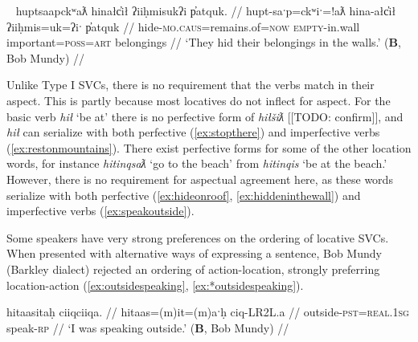 \ex~ \label{ex:hiddeninthewall}
\begingl
\glpreamble huptsaapckʷaƛ hinałc̓ił ʔiiḥmisukʔi p̓atquk. //
\gla hupt-saˑp=ckʷiˑ=!aƛ hina-ałc̓ił ʔiiḥmis=uk=ʔiˑ p̓atquk //
\glb hide-\textsc{mo.caus}=remains.of=\textsc{now} \textsc{empty}-in.wall important=\textsc{poss}=\textsc{art} belongings //
\glft `They hid their belongings in the walls.' (\textbf{B}, Bob Mundy) //
\endgl
\xe

\begin{comment}
This ``interruption" can occur the other way around, when the location word is intransitive.

\ex \label{ex:gasolinebydoor}
\begingl
\glpreamble ḥuqšiƛ ʔucačiƛ ḥaa yaqʔiitq hiiłsʔat̓uus gasoline.\footnotemark //
\gla ḥuq-šiƛ ʔu-ca-čiƛ ḥaa yaq=ʔiˑtq hił-L.sʔat̓uus gasoline //
\glb tip.over-\textsc{mo} \textsc{x}-go-\textsc{mo} who.what=\textsc{defn.3} be.at-by.the.door gasoline //
\glft `It knocked the gasoline over toward the door..' (\textbf{C}, \textit{tupaat} Julia Lucas) //
\endgl
\xe

\footnotetext{In this dependent construction, `gasoline' is the participant of the predicative relativizer \textit{yaq} `who'. The bracketing is [ḥuqšiƛ ʔucačiƛ]\textsubscript{pred} [ḥaa [yaqʔiitq hiiłsʔat̓uus gasoline] ]\textsubscript{part}}
\end{comment}

Unlike Type I SVCs, there is no requirement that the verbs match in their aspect. This is partly because most locatives do not inflect for aspect. For the basic verb \textit{hił} `be at' there is no perfective form of \textit{hiłšiƛ} [[TODO: confirm]], and \textit{hił} can serialize with both perfective (\ref{ex:stopthere}) and imperfective verbs (\ref{ex:restonmountains}). There exist perfective forms for some of the other location words, for instance \textit{hitinqsaƛ} `go to the beach' from \textit{hitinqis} `be at the beach.' However, there is no requirement for aspectual agreement here, as these words serialize with both perfective (\ref{ex:hideonroof}, \ref{ex:hiddeninthewall}) and imperfective verbs (\ref{ex:speakoutside}).

Some speakers have very strong preferences on the ordering of locative SVCs. When presented with alternative ways of expressing a sentence, Bob Mundy (Barkley dialect) rejected an ordering of action-location, strongly preferring location-action (\ref{ex:outsidespeaking}, \ref{ex:*outsidespeaking}).

\ex \label{ex:outsidespeaking}
\begingl
\glpreamble hitaasitaḥ ciiqciiqa. //
\gla hitaas=(m)it=(m)aˑḥ ciq-LR2L.a  //
\glb outside-\textsc{pst}=\textsc{real.1sg} speak-\textsc{rp} //
\glft `I was speaking outside.' (\textbf{B}, Bob Mundy) //
\endgl
\xe

